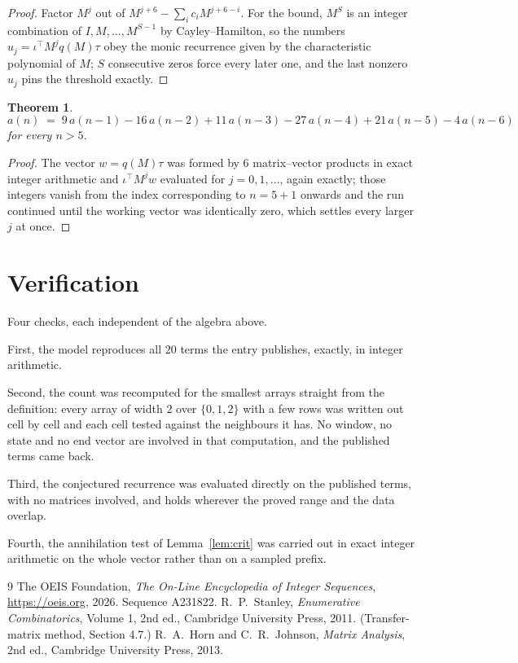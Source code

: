 \documentclass[11pt,a4paper]{article}
\theoremstyle{plain}
\newtheorem{theorem}{Theorem}
\theoremstyle{definition}
\begin{document}
\begin{proof}
Factor $M^{j}$ out of $M^{j+6}-\sum_ic_iM^{j+6-i}$. For the bound, $M^{S}$
is an integer combination of $I,M,\dots,M^{S-1}$ by Cayley--Hamilton, so the numbers
$u_j=\iota^{\!\top}M^{j}q(M)\tau$ obey the monic recurrence given by the characteristic
polynomial of $M$; $S$ consecutive zeros force every later one, and the last nonzero $u_j$
pins the threshold exactly.
\end{proof}

\begin{theorem}
\[
a(n)\;=\;9\,a(n-1) - 16\,a(n-2) + 11\,a(n-3) - 27\,a(n-4) + 21\,a(n-5) - 4\,a(n-6)
\]
for every $n>5$.
\end{theorem}

\begin{proof}
The vector $w=q(M)\tau$ was formed by $6$ matrix--vector products in exact integer
arithmetic and $\iota^{\!\top}M^{j}w$ evaluated for $j=0,1,\dots$, again exactly; those
integers vanish from the index corresponding to $n=5+1$ onwards and the run continued
until the working vector was identically zero, which settles every larger $j$ at once.
\end{proof}

\section{Verification}

Four checks, each independent of the algebra above.

First, the model reproduces all $20$ terms the entry publishes, exactly, in integer
arithmetic.

Second, the count was recomputed for the smallest arrays straight from the definition: every
array of width $2$ over $\{0,1,2\}$ with a few rows was written out cell by cell and each cell
tested against the neighbours it has. No window, no state and no end vector are involved in that
computation, and the published terms came back.

Third, the conjectured recurrence was evaluated directly on the published terms, with no
matrices involved, and holds wherever the proved range and the data overlap.

Fourth, the annihilation test of Lemma~\ref{lem:crit} was carried out in exact integer
arithmetic on the whole vector rather than on a sampled prefix.

\begin{thebibliography}{9}
 The OEIS Foundation, \emph{The On-Line Encyclopedia of Integer
Sequences}, \url{https://oeis.org}, 2026. Sequence A231822.
 R.~P.~Stanley, \emph{Enumerative Combinatorics}, Volume 1, 2nd ed.,
Cambridge University Press, 2011. (Transfer-matrix method, Section 4.7.)
 R.~A.~Horn and C.~R.~Johnson, \emph{Matrix Analysis}, 2nd ed., Cambridge
University Press, 2013.
\end{thebibliography}
\end{document}

